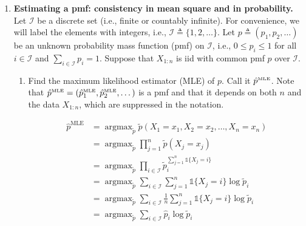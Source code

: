 \documentclass[11pt]{report}
\DeclareMathOperator*{\argmax}{\arg\max}
\newcommand{\ind}{{\mathds{1}}}
\newcommand{\teq}{\triangleq}
\begin{document}
\begin{enumerate}[1.]


          \pagebreak



    \item {\bf Estimating a pmf: consistency in mean square and in probability.} Let $\mathcal{I}$ be a discrete set (i.e., finite or countably infinite).  For convenience, we will label the elements with integers, i.e., $\mathcal{I}\teq\{1,2,\dotsc\}$.  Let $p\teq(p_1,p_2,\dotsc)$ be an unknown probability mass function (pmf) on $\mathcal{I}$, i.e., $0 \leq p_i \leq 1$ for all $i\in\mathcal{I}$ and $\sum_{i\in\mathcal{I}} p_i = 1$.  Suppose that $X_{1:n}$ is iid with common pmf $p$ over $\mathcal{I}$.
          \begin{enumerate}

              \item Find the maximum likelihood estimator (MLE) of $p$.  Call it $\hat p^{\text{\tiny MLE}}$. Note that $\hat p^{\text{\tiny MLE}}=(\hat p^{\text{\tiny MLE}}_1,\hat p^{\text{\tiny MLE}}_2,\dotsc)$ is a pmf and that it depends on both $n$ and the data $X_{1:n}$, which are suppressed in the notation.

                    \color{blue}
                    \begin{align*}
                        \hat p^{\text{MLE}} & = \argmax_{\tilde p} \tilde p(X_1 = x_1, X_2 = x_2, \ldots, X_n = x_n)                                  \\
                                            & = \argmax_{\tilde p} \prod_{j = 1}^n \tilde p(X_j = x_j)                                                \\
                                            & = \argmax_{\tilde p} \prod_{i \in \mathcal I} \tilde p_i^{\sum_{j=1}^{n} \ind\{X_j = i\} }              \\
                                            & = \argmax_{\tilde p} \sum_{i \in \mathcal I} \sum_{j=1}^{n} \ind\{X_j = i\} \log \tilde p_i             \\
                                            & =  \argmax_{\tilde p} \sum_{i \in \mathcal I} \frac{1}{n}\sum_{j=1}^{n} \ind\{X_j = i\} \log \tilde p_i \\
                                            & = \argmax_{\tilde p} \sum_{i \in \mathcal I} \hat p_i \log \tilde p_i                                   \\
                    \end{align*}


\end{enumerate}
\end{enumerate}
\end{document}
